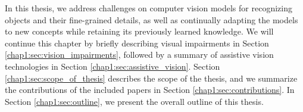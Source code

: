 In this thesis, we address challenges on computer vision models for recognizing objects and their fine-grained details, as well as continually adapting the models to new concepts while retaining its previously learned knowledge. 
We will continue this chapter by briefly describing visual impairments in Section \ref{chap1:sec:vision_impairments}, followed by a summary of assistive vision technologies in Section \ref{chap1:sec:assistive_vision}. Section \ref{chap1:sec:scope_of_thesis} describes the scope of the thesis, and we summarize the contributions of the included papers in Section \ref{chap1:sec:contributions}. In Section \ref{chap1:sec:outline}, we present the overall outline of this thesis. 





